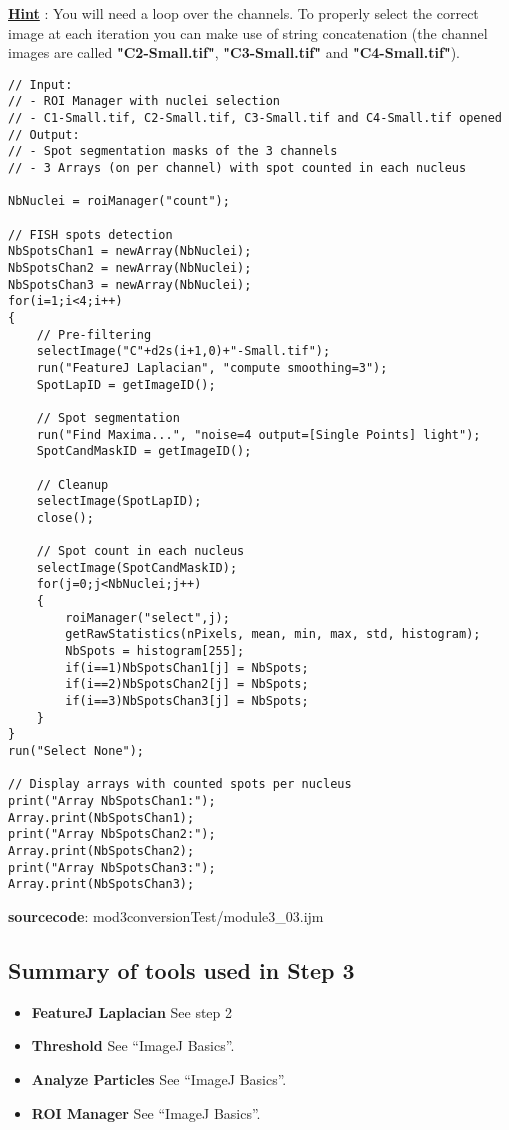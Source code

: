 \textbf{\underline{Hint}} : You will need a loop over the channels. To properly select the correct image at each iteration you can make use of string concatenation (the channel images are called \textbf{"C2-Small.tif"}, \textbf{"C3-Small.tif"} and \textbf{"C4-Small.tif"}).


\begin{lstlisting}[linerange={1-6}]
// Input: 
// - ROI Manager with nuclei selection
// - C1-Small.tif, C2-Small.tif, C3-Small.tif and C4-Small.tif opened
// Output: 
// - Spot segmentation masks of the 3 channels
// - 3 Arrays (on per channel) with spot counted in each nucleus

NbNuclei = roiManager("count");

// FISH spots detection
NbSpotsChan1 = newArray(NbNuclei);
NbSpotsChan2 = newArray(NbNuclei);
NbSpotsChan3 = newArray(NbNuclei);
for(i=1;i<4;i++)
{
	// Pre-filtering
	selectImage("C"+d2s(i+1,0)+"-Small.tif");
	run("FeatureJ Laplacian", "compute smoothing=3");
	SpotLapID = getImageID();
	
	// Spot segmentation
	run("Find Maxima...", "noise=4 output=[Single Points] light");
	SpotCandMaskID = getImageID();

	// Cleanup
	selectImage(SpotLapID);
	close();
	
	// Spot count in each nucleus
	selectImage(SpotCandMaskID);
	for(j=0;j<NbNuclei;j++)
	{ 	
		roiManager("select",j);
		getRawStatistics(nPixels, mean, min, max, std, histogram);
		NbSpots = histogram[255];
		if(i==1)NbSpotsChan1[j] = NbSpots;
		if(i==2)NbSpotsChan2[j] = NbSpots;
		if(i==3)NbSpotsChan3[j] = NbSpots;
	}	
}
run("Select None");

// Display arrays with counted spots per nucleus
print("Array NbSpotsChan1:");
Array.print(NbSpotsChan1);
print("Array NbSpotsChan2:");
Array.print(NbSpotsChan2);
print("Array NbSpotsChan3:");
Array.print(NbSpotsChan3);
\end{lstlisting}
\textbf{sourcecode}: mod3conversionTest/module3_03.ijm

\subsection{Summary of tools used in Step 3}

\begin{itemize}
\item\textbf{FeatureJ Laplacian} See step 2

\item\textbf{Threshold} See ``ImageJ Basics''.
\item\textbf{Analyze Particles} See ``ImageJ Basics''.
\item\textbf{ROI Manager} See ``ImageJ Basics''.

\end{itemize}

\newpage
